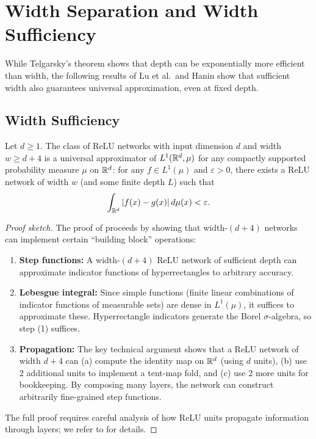 \documentclass[11pt,a4paper]{article}
\begin{document}
\section{Width Separation and Width Sufficiency}
\label{sec:width}

While Telgarsky's theorem shows that depth can be exponentially
more efficient than width, the following results of Lu et al.\ and
Hanin show that sufficient width also guarantees universal
approximation, even at fixed depth.

\subsection{Width Sufficiency}

\begin{theorem}
\label{thm:lu}
Let $d \ge 1$.  The class of ReLU networks with input dimension $d$
and width $w \ge d + 4$ is a universal approximator of $L^1(\mathbb{R}^d,
\mu)$ for any compactly supported probability measure $\mu$ on $\mathbb{R}^d$:
for any $f \in L^1(\mu)$ and $\varepsilon > 0$, there exists a ReLU
network of width $w$ (and some finite depth $L$) such that
\[
  \int_{\mathbb{R}^d} |f(x) - g(x)| \, d\mu(x) < \varepsilon.
\]
\end{theorem}

\begin{proof}[Proof sketch]
The proof of \citet{lu2017} proceeds by showing that width-$(d+4)$
networks can implement certain ``building block'' operations:
\begin{enumerate}[nosep]
  \item \textbf{Step functions:} A width-$(d+4)$ ReLU network of
    sufficient depth can approximate indicator functions of
    hyperrectangles to arbitrary accuracy.
  \item \textbf{Lebesgue integral:} Since simple functions (finite
    linear combinations of indicator functions of measurable sets)
    are dense in $L^1(\mu)$, it suffices to approximate these.
    Hyperrectangle indicators generate the Borel $\sigma$-algebra,
    so step (1) suffices.
  \item \textbf{Propagation:} The key technical argument shows that
    a ReLU network of width $d + 4$ can (a) compute the identity
    map on $\mathbb{R}^d$ (using $d$ units), (b) use $2$ additional units to
    implement a tent-map fold, and (c) use $2$ more units for
    bookkeeping.  By composing many layers, the network can construct
    arbitrarily fine-grained step functions.
\end{enumerate}
The full proof requires careful analysis of how ReLU units propagate
information through layers; we refer to \citet{lu2017} for details.
\end{proof}
\end{document}
